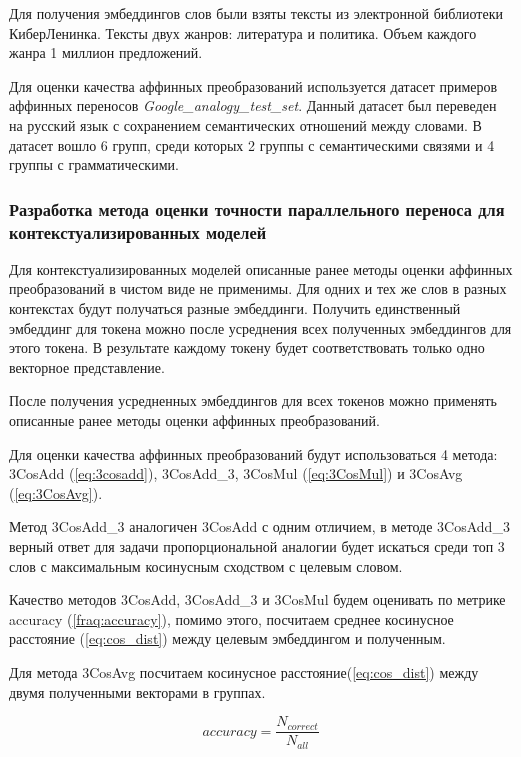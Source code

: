 \documentclass[a4paper,14pt]{article}
\begin{document}
Для получения эмбеддингов слов были взяты тексты из электронной библиотеки КиберЛенинка.
Тексты двух жанров: литература и политика.
Объем каждого жанра 1 миллион предложений.

Для оценки качества аффинных преобразований используется датасет примеров аффинных переносов \textit{Google\_analogy\_test\_set}.
Данный датасет был переведен на русский язык с сохранением семантических отношений между словами.
В датасет вошло 6 групп, среди которых 2 группы с семантическими связями и 4 группы с грамматическими.

\subsubsection{Разработка метода оценки точности параллельного переноса для контекстуализированных моделей}

Для контекстуализированных моделей описанные ранее методы оценки аффинных преобразований в чистом виде не применимы.
Для одних и тех же слов в разных контекстах будут получаться разные эмбеддинги.
Получить единственный эмбеддинг для токена можно после усреднения всех полученных эмбеддингов для этого токена.
В результате каждому токену будет соответствовать только одно векторное представление.

После получения усредненных эмбеддингов для всех токенов можно применять описанные ранее методы оценки аффинных преобразований.



Для оценки качества аффинных преобразований будут использоваться 4 метода: 3CosAdd (\ref{eq:3cosadd}), 3CosAdd\_3,  3CosMul (\ref{eq:3CosMul}) и 3CosAvg (\ref{eq:3CosAvg}).

Метод 3CosAdd\_3 аналогичен 3CosAdd с одним отличием, в методе 3CosAdd\_3 верный ответ для задачи пропорциональной аналогии будет искаться среди топ 3 слов с максимальным косинусным сходством с целевым словом.

Качество методов 3CosAdd, 3CosAdd\_3 и 3CosMul будем оценивать по метрике accuracy (\ref{fraq:accuracy}), помимо этого, посчитаем среднее косинусное расстояние (\ref{eq:cos_dist}) между целевым эмбеддингом и полученным. 

Для метода 3CosAvg посчитаем косинусное расстояние(\ref{eq:cos_dist}) между двумя полученными векторами в группах.

\begin{equation}
	accuracy = \dfrac{N_{correct}}{N_{all}}
	\label{fraq:accuracy}
\end{equation}
\end{document}

